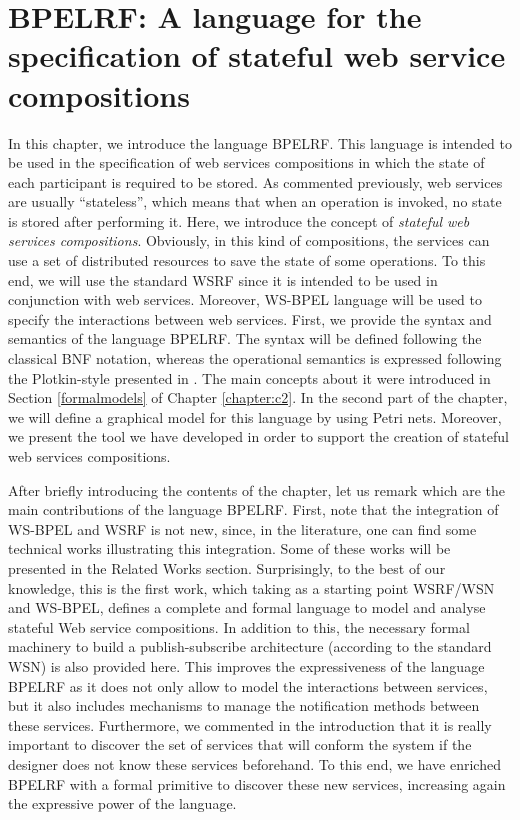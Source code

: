 \chapter{BPELRF: A language for the specification of stateful web service compositions}\label{chapter:c4}

In this chapter, we introduce the language BPELRF. This language is intended to be used in the specification of web services compositions in which the state
of each participant is required to be stored. As commented previously, web services are usually ``stateless'', which means that when an operation is invoked, no 
state is stored after performing it. Here, we introduce the concept of \emph{stateful web services compositions}. Obviously, in this kind of compositions,
the services can use a set of distributed resources to save the state of some operations. To this end, we will use the standard WSRF since it is intended to be used 
in conjunction with web services. Moreover, WS-BPEL language will be used to specify the interactions between web services. First, we provide the syntax and semantics of the language BPELRF. The syntax will be defined following the classical BNF notation, whereas the operational semantics is expressed following the Plotkin-style presented in \cite{Plotkin81}. The main concepts about it were introduced in Section \ref{formalmodels} of Chapter \ref{chapter:c2}. In the second part of the chapter, we will define a graphical model for this language by using Petri nets. Moreover, we present the tool we have developed in order to support the creation of stateful web services compositions. 

After briefly introducing the contents of the chapter, let us remark which are the main contributions of the language BPELRF. First, note that 
the integration of WS-BPEL and WSRF is not new, since, in the literature, one can find some technical works illustrating this integration. Some of these works will be presented in the Related Works section. Surprisingly, to the best of our knowledge, this is the first work, which taking as a starting point WSRF/WSN and WS-BPEL, defines a complete and formal language to model and analyse stateful Web service compositions. In addition to this, the necessary formal machinery to build a publish-subscribe architecture (according to the standard WSN) is also provided here. This improves the expressiveness of the language BPELRF 
as it does not only allow to model the interactions between services, but it also includes mechanisms to manage the notification methods between these services. Furthermore, we commented in the introduction that it is really important to discover the set of services that will conform the system if the designer does not know these services beforehand. To this end, we have enriched BPELRF with a formal primitive to discover these new services, increasing again the expressive power of the language. 

